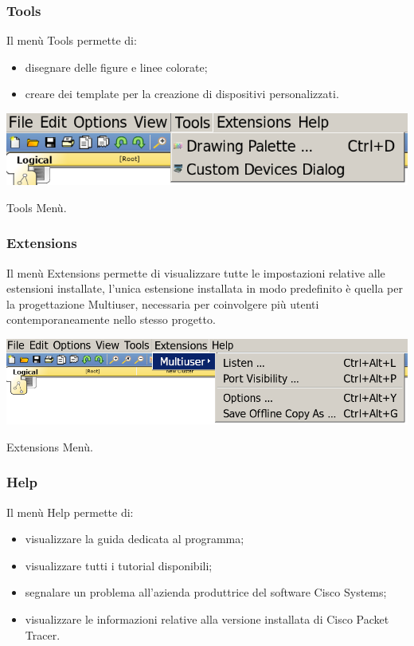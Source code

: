 \subsubsection{Tools}
Il menù Tools permette di: 

\begin{itemize}
    \item disegnare delle figure e linee colorate;
    \item creare dei template per la creazione di dispositivi personalizzati.
\end{itemize}

\begin{sfigure}
    \centering
    \captionsetup{type=figure}
    \includegraphics[scale=.3]{images/02.packet-tracer/tools.png}
    \caption{Tools Menù.}
\end{sfigure}

\subsubsection{Extensions}
Il menù Extensions permette di visualizzare tutte le impostazioni relative alle estensioni installate, l'unica estensione installata in modo predefinito è quella per la progettazione Multiuser, necessaria per coinvolgere più utenti contemporaneamente nello stesso progetto.

\begin{sfigure}
    \centering
    \captionsetup{type=figure}
    \includegraphics[scale=.35]{images/02.packet-tracer/extensions.png}
    \caption{Extensions Menù.}
\end{sfigure}

\subsubsection{Help}
Il menù Help permette di: 

\begin{itemize}
    \item visualizzare la guida dedicata al programma;
    \item visualizzare tutti i tutorial disponibili;
    \item segnalare un problema all'azienda produttrice del software Cisco Systems;
    \item visualizzare le informazioni relative alla versione installata di Cisco Packet Tracer.
\end{itemize}

